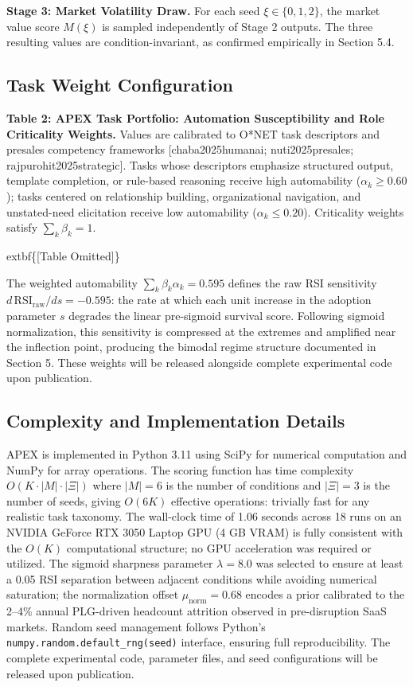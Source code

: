 \documentclass[10pt, conference]{IEEEtran}
\begin{document}
\textbf{Stage 3: Market Volatility Draw.} For each seed $\xi \in \{0, 1, 2\}$, the market value score $M(\xi)$ is sampled independently of Stage 2 outputs. The three resulting values are condition-invariant, as confirmed empirically in Section 5.4.

\subsection{Task Weight Configuration}

\label{sec:task_weight_configuration}

\textbf{Table 2: APEX Task Portfolio: Automation Susceptibility and Role Criticality Weights.} Values are calibrated to O*NET task descriptors and presales competency frameworks [chaba2025humanai; nuti2025presales; rajpurohit2025strategic]. Tasks whose descriptors emphasize structured output, template completion, or rule-based reasoning receive high automability ($\alpha_k \geq 0.60$); tasks centered on relationship building, organizational navigation, and unstated-need elicitation receive low automability ($\alpha_k \leq 0.20$). Criticality weights satisfy $\sum_k \beta_k = 1$.

	extbf\{[Table Omitted]\}

The weighted automability $\sum_k \beta_k \alpha_k = 0.595$ defines the raw RSI sensitivity $d\,\text{RSI}_{\text{raw}}/ds = -0.595$: the rate at which each unit increase in the adoption parameter $s$ degrades the linear pre-sigmoid survival score. Following sigmoid normalization, this sensitivity is compressed at the extremes and amplified near the inflection point, producing the bimodal regime structure documented in Section 5. These weights will be released alongside complete experimental code upon publication.

\subsection{Complexity and Implementation Details}

\label{sec:complexity_and_implementation_details}

APEX is implemented in Python 3.11 using SciPy \cite{virtanen2020scipy} for numerical computation and NumPy for array operations. The scoring function has time complexity $O(K \cdot |M| \cdot |\Xi|)$ where $|M| = 6$ is the number of conditions and $|\Xi| = 3$ is the number of seeds, giving $O(6K)$ effective operations: trivially fast for any realistic task taxonomy. The wall-clock time of 1.06 seconds across 18 runs on an NVIDIA GeForce RTX 3050 Laptop GPU (4 GB VRAM) is fully consistent with the $O(K)$ computational structure; no GPU acceleration was required or utilized. The sigmoid sharpness parameter $\lambda = 8.0$ was selected to ensure at least a 0.05 RSI separation between adjacent conditions while avoiding numerical saturation; the normalization offset $\mu_{\text{norm}} = 0.68$ encodes a prior calibrated to the 2--4\% annual PLG-driven headcount attrition observed in pre-disruption SaaS markets. Random seed management follows Python's \texttt{numpy.random.default\_rng(seed)} interface, ensuring full reproducibility. The complete experimental code, parameter files, and seed configurations will be released upon publication.
\end{document}
